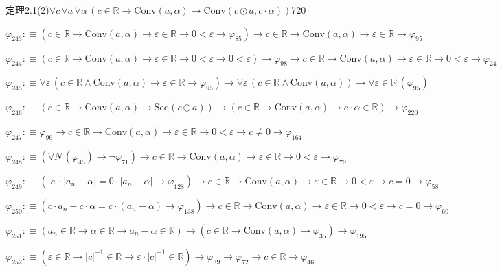 \begin{fullproof}{定理2.1(2)}{$\forall c\,\forall a\,\forall \alpha\,(c \in \mathbb{R} \to \mathrm{Conv}(a,\alpha) \to \mathrm{Conv}(c \odot a,c \cdot \alpha))$}{720}
\begin{abbrevlist}
\item $\varphi_{243} :\equiv (c \in \mathbb{R} \to \mathrm{Conv}(a,\alpha) \to \varepsilon \in \mathbb{R} \to 0 < \varepsilon \to \varphi_{85}) \to c \in \mathbb{R} \to \mathrm{Conv}(a,\alpha) \to \varepsilon \in \mathbb{R} \to \varphi_{95}$
\item $\varphi_{244} :\equiv (c \in \mathbb{R} \to \mathrm{Conv}(a,\alpha) \to \varepsilon \in \mathbb{R} \to 0 < \varepsilon \to 0 < \varepsilon) \to \varphi_{98} \to c \in \mathbb{R} \to \mathrm{Conv}(a,\alpha) \to \varepsilon \in \mathbb{R} \to 0 < \varepsilon \to \varphi_{24}$
\item $\varphi_{245} :\equiv \forall \varepsilon\,(c \in \mathbb{R} \land \mathrm{Conv}(a,\alpha) \to \varepsilon \in \mathbb{R} \to \varphi_{95}) \to \forall \varepsilon\,(c \in \mathbb{R} \land \mathrm{Conv}(a,\alpha)) \to \forall \varepsilon \in \mathbb{R}\,(\varphi_{95})$
\item $\varphi_{246} :\equiv (c \in \mathbb{R} \to \mathrm{Conv}(a,\alpha) \to \mathrm{Seq}(c \odot a)) \to (c \in \mathbb{R} \to \mathrm{Conv}(a,\alpha) \to c \cdot \alpha \in \mathbb{R}) \to \varphi_{220}$
\item $\varphi_{247} :\equiv \varphi_{96} \to c \in \mathbb{R} \to \mathrm{Conv}(a,\alpha) \to \varepsilon \in \mathbb{R} \to 0 < \varepsilon \to c \neq 0 \to \varphi_{164}$
\item $\varphi_{248} :\equiv (\forall N\,(\varphi_{45}) \to \neg \varphi_{71}) \to c \in \mathbb{R} \to \mathrm{Conv}(a,\alpha) \to \varepsilon \in \mathbb{R} \to 0 < \varepsilon \to \varphi_{79}$
\item $\varphi_{249} :\equiv (\lvert c \rvert \cdot \lvert a_{n} - \alpha \rvert = 0 \cdot \lvert a_{n} - \alpha \rvert \to \varphi_{128}) \to c \in \mathbb{R} \to \mathrm{Conv}(a,\alpha) \to \varepsilon \in \mathbb{R} \to 0 < \varepsilon \to c = 0 \to \varphi_{58}$
\item $\varphi_{250} :\equiv (c \cdot a_{n} - c \cdot \alpha = c \cdot (a_{n} - \alpha) \to \varphi_{138}) \to c \in \mathbb{R} \to \mathrm{Conv}(a,\alpha) \to \varepsilon \in \mathbb{R} \to 0 < \varepsilon \to c = 0 \to \varphi_{60}$
\item $\varphi_{251} :\equiv (a_{n} \in \mathbb{R} \to \alpha \in \mathbb{R} \to a_{n} - \alpha \in \mathbb{R}) \to (c \in \mathbb{R} \to \mathrm{Conv}(a,\alpha) \to \varphi_{35}) \to \varphi_{195}$
\item $\varphi_{252} :\equiv (\varepsilon \in \mathbb{R} \to \lvert c \rvert^{-1} \in \mathbb{R} \to \varepsilon \cdot \lvert c \rvert^{-1} \in \mathbb{R}) \to \varphi_{39} \to \varphi_{72} \to c \in \mathbb{R} \to \varphi_{46}$

\end{abbrevlist}
\end{fullproof}
